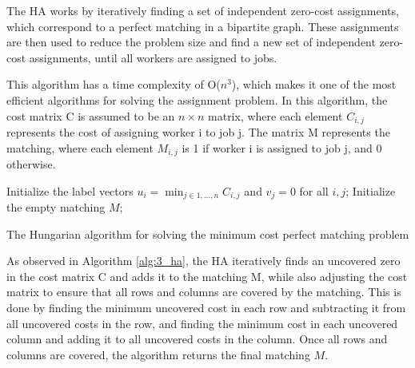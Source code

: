 The \ac{HA} works by iteratively finding a set of independent zero-cost assignments, which correspond to a perfect matching in a bipartite graph. These assignments are then used to reduce the problem size and find a new set of independent zero-cost assignments, until all workers are assigned to jobs.

This algorithm has a time complexity of O($n^3$), which makes it one of the most efficient algorithms for solving the assignment problem. In this algorithm, the cost matrix C is assumed to be an $n \times n$ matrix, where each element $C_{i,j}$ represents the cost of assigning worker i to job j. The matrix M represents the matching, where each element $M_{i,j}$ is 1 if worker i is assigned to job j, and 0 otherwise.

\begin{algorithm}[]
	\SetAlgoLined
	\DontPrintSemicolon
	Initialize the label vectors $u_i = \min_{j\in{1,\dots,n}} C_{i,j}$ and $v_j=0$ for all $i,j$;
	Initialize the empty matching $M$;
	\caption{The Hungarian algorithm for solving the minimum cost perfect matching problem}
	\label{alg:3_ha}
\end{algorithm}

As observed in Algorithm \ref{alg:3_ha}, the \ac{HA} iteratively finds an uncovered zero in the cost matrix C and adds it to the matching M, while also adjusting the cost matrix to ensure that all rows and columns are covered by the matching. This is done by finding the minimum uncovered cost in each row and subtracting it from all uncovered costs in the row, and finding the minimum cost in each uncovered column and adding it to all uncovered costs in the column. Once all rows and columns are covered, the algorithm returns the final matching $M$.

